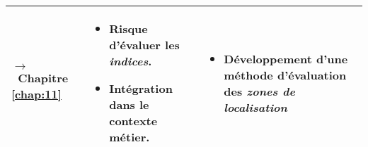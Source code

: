 \begin{tabular}{L{.2\textheight}L{.35\textheight}L{.35\textheight}}
{\par\footnotesize\hspace{.25cm}$\longrightarrow$~Chapitre
\ref{chap:11}} & \begin{minipage}{.35\textheight} \small
    \begin{itemize}
    \item Risque d'évaluer les \emph{indices}.
    \item Intégration dans le contexte métier.
    \end{itemize}
  \end{minipage}& \begin{minipage}{.35\textheight}
    \begin{itemize}
    \item Développement d'une méthode d'évaluation des \emph{zones de
        localisation}
    \end{itemize}
  \end{minipage}\\
  \bottomrule
\end{tabular}
